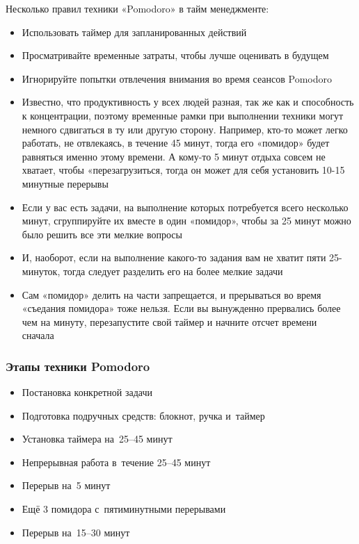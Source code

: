 \documentclass{../industrial-development}
\begin{document}
\lecturenotes

Несколько правил техники «Pomodoro» в тайм менеджменте:
\begin{itemize}
\item Использовать таймер для запланированных действий
\item Просматривайте временные затраты, чтобы лучше оценивать в будущем
\item Игнорируйте попытки отвлечения внимания во время сеансов Pomodoro~\cite{TMSeimer}
\item Известно, что продуктивность у всех людей разная, так же как и способность к концентрации, поэтому временные рамки при выполнении техники могут немного сдвигаться в ту или другую сторону. Например, кто-то может легко работать, не отвлекаясь, в течение 45 минут, тогда его «помидор» будет равняться именно этому времени. А кому-то 5 минут отдыха совсем не хватает, чтобы «перезагрузиться, тогда он может для себя установить 10-15 минутные перерывы
\item Если у вас есть задачи, на выполнение которых потребуется всего несколько минут, сгруппируйте их вместе в один «помидор», чтобы за 25 минут можно было решить все эти мелкие вопросы
\item И, наоборот, если на выполнение какого-то задания вам не хватит пяти 25-минуток, тогда следует разделить его на более мелкие задачи
\item Сам «помидор» делить на части запрещается, и прерываться во время «съедания помидора» тоже нельзя. Если вы вынужденно прервались более чем на минуту, перезапустите свой таймер и начните отсчет времени сначала~\cite{Pomidoro}
\end{itemize}

\begin{frame} \frametitle{Этапы техники Pomodoro}
  \begin{itemize}
  \item Постановка конкретной задачи
  \item Подготовка подручных средств: блокнот, ручка и~таймер
  \item Установка таймера на~25--45 минут
  \item Непрерывная работа в~течение 25--45 минут
  \item Перерыв на~5 минут
  \item Ещё 3 помидора с~пятиминутными перерывами
  \item Перерыв на~15--30 минут
  \end{itemize}
\end{frame}
\end{document}
